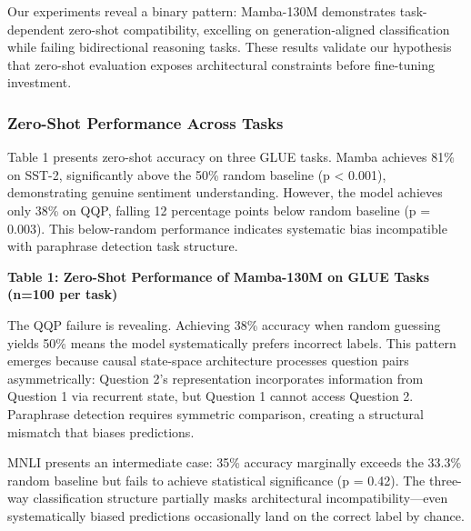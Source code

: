 
Our experiments reveal a binary pattern: Mamba-130M demonstrates task-dependent zero-shot compatibility, excelling on generation-aligned classification while failing bidirectional reasoning tasks. These results validate our hypothesis that zero-shot evaluation exposes architectural constraints before fine-tuning investment.

\subsubsection{Zero-Shot Performance Across Tasks}

Table 1 presents zero-shot accuracy on three GLUE tasks. Mamba achieves 81\% on SST-2, significantly above the 50\% random baseline (p < 0.001), demonstrating genuine sentiment understanding. However, the model achieves only 38\% on QQP, falling 12 percentage points below random baseline (p = 0.003). This below-random performance indicates systematic bias incompatible with paraphrase detection task structure.

\textbf{Table 1: Zero-Shot Performance of Mamba-130M on GLUE Tasks (n=100 per task)}

\begin{table}[htbp]
\centering
{}
\end{table}

The QQP failure is revealing. Achieving 38\% accuracy when random guessing yields 50\% means the model systematically prefers incorrect labels. This pattern emerges because causal state-space architecture processes question pairs asymmetrically: Question 2's representation incorporates information from Question 1 via recurrent state, but Question 1 cannot access Question 2. Paraphrase detection requires symmetric comparison, creating a structural mismatch that biases predictions.

MNLI presents an intermediate case: 35\% accuracy marginally exceeds the 33.3\% random baseline but fails to achieve statistical significance (p = 0.42). The three-way classification structure partially masks architectural incompatibility---even systematically biased predictions occasionally land on the correct label by chance.

